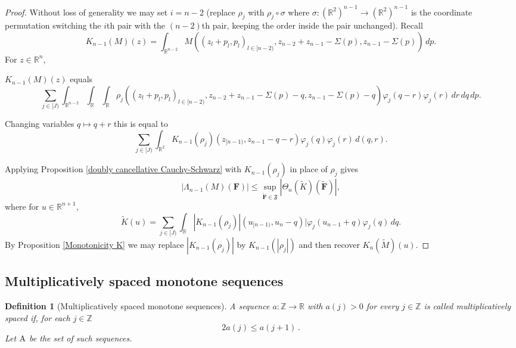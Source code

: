 \documentclass[12pt,reqno]{amsart}
\theoremstyle{plain}
\newtheorem{definition}[theorem]{Definition}
\numberwithin{equation}{section}
\theoremstyle{remark}
\newcommand{\Z}{{\mathbb Z}}
\newcommand{\R}{{\mathbb R}}
\newcommand{\F}{\mathbf{F}}
\begin{document}
\begin{proof}Without loss of generality we may set $i=n-2$ (replace $\rho_j$ with $\rho_j\circ \sigma$ where $\sigma:(\R^2)^{n-1}\to (\R^2)^{n-1}$ is the coordinate permutation switching the  $i$th pair with the $(n-2)$th pair, keeping the order inside the pair unchanged).
Recall
\[ K_{n-1}(M)(z) = \int_{\R^{n-2}} M((z_l+p_l,p_l)_{l\in [n-2)}, z_{n-2} + z_{n-1} - \Sigma(p), z_{n-1} - \Sigma(p))\,dp. \]
For $z\in\R^n$,

$K_{n-1}(M)(z)$ equals
\[ \sum_{j\in [J)} \int_{\R^{n-2}} \int_\R \int_\R \rho_j((z_l+p_l,p_l)_{l\in [n-2)}, z_{n-2} + z_{n-1} - \Sigma(p) - q, z_{n-1} - \Sigma(p) - q) \varphi_j(q-r)\varphi_j(r)\,dr\,dq\,dp.  \]


Changing variables $q\mapsto q+r$ this is equal to
\[ \sum_{j\in [J)} \int_{\R^2} K_{n-1}(\rho_j)(z_{[n-1)}, z_{n-1} - q - r)\varphi_j(q)\varphi_j(r)\,d(q,r). \]

Applying Proposition \ref{doubly cancellative Cauchy-Schwarz} with $K_{n-1}(\rho_j)$ in place of $\rho_j$ gives
\[ |\Lambda_{n-1}(M)(\F)| \le \sup_{\mathbf{\tilde{F}}\in\mathfrak{F}}|\Theta_n(\tilde{K})(\mathbf{\tilde{F}})|,  \]
where for $u\in \R^{n+1}$,
\[
\tilde{K}(u)=\sum_{j\in [J)}\int_\R |K_{n-1}(\rho_j)|(u_{[n-1)}, u_{n}-q)| \varphi_j(u_{n-1}+q) \varphi_j(q) \, dq.
\]
By Proposition \ref{Monotonicity K} we may replace $|K_{n-1}(\rho_j)|$ by $K_{n-1}(|\rho_j|)$ and then recover $K_n(\tilde{M})(u)$.
\end{proof}

\subsection{Multiplicatively spaced monotone sequences}

\begin{definition}[Multiplicatively spaced monotone sequences]\label{multiplicatively spaced monotone sequences}
A sequence $a:\Z\to\R$ with $a(j)>0$ for every $j\in\Z$ is called multiplicatively spaced if, for each $j\in\Z$
\begin{equation}\label{auto:spaced-sequence-growth}
    2a(j)\le a(j+1)\, .
\end{equation}
Let ${\rm A}$ be the set of such sequences.
\end{definition}
\end{document}
